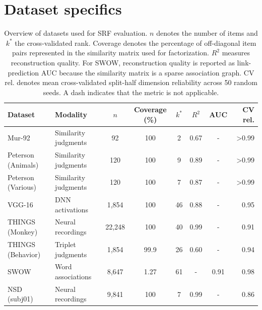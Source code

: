 \documentclass{article}
\begin{document}
\clearpage
\section{Dataset specifics}

\begin{table}[htb]
  \centering
  \caption{Overview of datasets used for SRF evaluation. $n$ denotes the number of items and $k^*$ the cross-validated rank. Coverage denotes the percentage of off-diagonal item pairs represented in the similarity matrix used for factorization. $R^2$ measures reconstruction quality. For SWOW, reconstruction quality is reported as link-prediction AUC because the similarity matrix is a sparse association graph. CV rel. denotes mean cross-validated split-half dimension reliability across 50 random seeds. A dash indicates that the metric is not applicable.}
  \label{tab:datasets}
  \begin{tabular}{llcccccr}
  \toprule
  Dataset & Modality & $n$ & Coverage (\%) & $k^*$ & $R^2$ & AUC & CV rel. \\
  \midrule
  Mur-92            & Similarity judgments & 92       & 100 &  2 & 0.67 & -  & >0.99 \\
  Peterson (Animals)& Similarity judgments & 120      & 100 &  9 & 0.89 & -  & >0.99 \\
  Peterson (Various)& Similarity judgments & 120      & 100 &  7 & 0.87 & -  & >0.99 \\
  VGG-16            & DNN activations      & 1{,}854  & 100 & 46 & 0.88 & -  & 0.95 \\
  THINGS (Monkey)   & Neural recordings    & 22{,}248 & 100 & 40 & 0.99 & -  & 0.91 \\
  THINGS (Behavior) & Triplet judgments & 1{,}854 & 99.9 & 26 & 0.60 & - & 0.94 \\
  SWOW              & Word associations    & 8{,}647  & 1.27        & 61 & -  & 0.91 & 0.98 \\
  NSD (subj01)      & Neural recordings    & 9{,}841  & 100 &  7 & 0.99 & -  & 0.86 \\
  \bottomrule
  \end{tabular}
\end{table}
\end{document}
